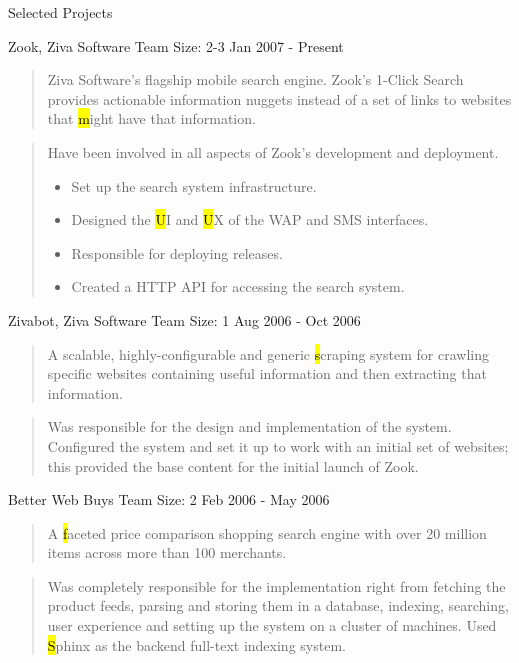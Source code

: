 \documentclass{resume}
\newcommand{\teamsize}{\hfill\sc\footnotesize Team Size: }
\begin{document}
\begin{category}{Selected Projects}{}
    \item {\topic Zook,} Ziva Software
        {\teamsize 2-3}
        {\period Jan 2007 - Present}

        \begin{quote}
            Ziva Software's flagship mobile search engine. Zook's 1-Click
            Search provides actionable information nuggets instead of a set of
            links to websites that {\hl might} have that information.
        \end{quote}

        \begin{quote}
            Have been involved in all aspects of Zook's development and
            deployment.
            \begin{itemize}
                \item Set up the search system infrastructure.
                \item Designed the {\hl UI} and {\hl UX} of the WAP and SMS
                    interfaces.
                \item Responsible for deploying releases.
                \item Created a HTTP API for accessing the search system.
            \end{itemize}
        \end{quote}

    \pagebreak

    \item {\topic Zivabot,} Ziva Software
        {\teamsize 1}
        {\period Aug 2006 - Oct 2006}
        \begin{quote}
            A scalable, highly-configurable and generic {\hl scraping system}
            for crawling specific websites containing useful information and
            then extracting that information.
        \end{quote}
        \begin{quote}
            Was responsible for the design and implementation of the system.
            Configured the system and set it up to work with an initial set of
            websites; this provided the base content for the initial launch of
            Zook.
        \end{quote}

    \item {\topic Better Web Buys}
        {\teamsize 2}
        {\period Feb 2006 - May 2006}
        \begin{quote}
            A {\hl faceted price comparison shopping search engine} with over
            20 million items across more than 100 merchants.
        \end{quote}
        \begin{quote}
            Was completely responsible for the implementation right from
            fetching the product feeds, parsing and storing them in a database,
            indexing, searching, user experience and setting up the system on a
            cluster of machines. Used {\hl Sphinx} as the backend full-text
            indexing system.
        \end{quote}


\end{category}
\end{document}
